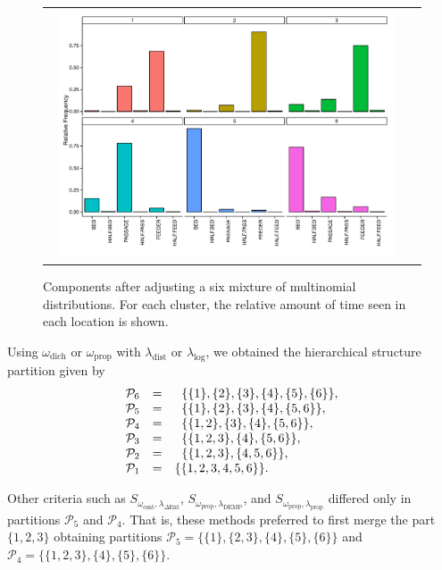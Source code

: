 \documentclass[submit]{smj}
\theoremstyle{definition}
\begin{document}
\begin{figure}[hpdb]
\begin{center}
\begin{tabular}{cc}
  \includegraphics[width=0.95\textwidth]{figures/multinomial_mixt_all.pdf} \\
 \end{tabular}
 \caption{Components after adjusting a six mixture of multinomial distributions. For each cluster, the relative amount of time seen in each location is shown.}\label{multinomial_mixture}
\end{center}
\end{figure}

Using $\omega_{\text{dich}}$ or  $\omega_{\text{prop}}$ with $\lambda_{\text{dist}}$ or $\lambda_{\log}$, we obtained the hierarchical structure partition given by
\begin{equation}
\begin{array}{r c l}
 \mathcal{P}_6&=& \;\; \{\{1\},\{2\},\{3\},\{4\},\{5\},\{6\}\}, \\
 \mathcal{P}_5&=& \;\; \{\{1\},\{2\},\{3\},\{4\},\{5,6\}\}, \\ 
 \mathcal{P}_4&=& \;\; \{\{1,2\},\{3\},\{4\},\{5,6\}\}, \\ 
 \mathcal{P}_3&=& \;\; \{\{1,2,3\},\{4\},\{5,6\}\}, \\ 
 \mathcal{P}_2&=& \;\; \{\{1,2,3\},\{4,5,6\}\}, \\ 
 \mathcal{P}_1&=& \{\{1,2,3,4,5,6\}\}.
\end{array}
\label{hier_ex_multinomial}
\end{equation}

Other criteria such as $S_{\omega_{\text{csnt}},\lambda_{\Delta\text{Ent}}}$,  $S_{\omega_{\text{prop}},\lambda_{\text{DEMP}}}$,  and $S_{\omega_{\text{prop}},\lambda_{\text{prop}}}$ differed only in partitions $\mathcal{P}_5$ and $\mathcal{P}_4$.  That is, these methods preferred to first merge the part $\{1,2,3\}$ obtaining partitions $\mathcal{P}_5 = \{\{1\},\{2, 3\},\{4\},\{5\} ,\{6\}\}$ and $\mathcal{P}_4 = \{\{1,2,3\},\{4\},\{5\},\{6\}\}$.
\end{document}
